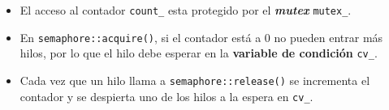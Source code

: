 \begin{Shaded}
\begin{Highlighting}[]
\OperatorTok{\{}
\OperatorTok{:}

\OperatorTok{(}\OperatorTok{=} \OperatorTok{)} \OperatorTok{:} \OperatorTok{(}\OperatorTok{)} \OperatorTok{\{\}}

    \OperatorTok{()} \OperatorTok{\{}
        \OperatorTok{\textless{}}\OperatorTok{\textgreater{}}\OperatorTok{(}\OperatorTok{);} 
        \OperatorTok{++;}
        \OperatorTok{();}                          
    \OperatorTok{\}}

    \OperatorTok{()} \OperatorTok{\{}
        \OperatorTok{\textless{}}\OperatorTok{\textgreater{}}\OperatorTok{(}\OperatorTok{);} 
        \OperatorTok{(} \OperatorTok{==} \OperatorTok{)} \OperatorTok{\{}
            \OperatorTok{(}\OperatorTok{);}                        
        \OperatorTok{\}}
        \OperatorTok{{-}{-};}
    \OperatorTok{\}}

\OperatorTok{:}
    \OperatorTok{;}
    \OperatorTok{;}
     \OperatorTok{;}
\OperatorTok{\};}
\end{Highlighting}
\end{Shaded}

\begin{itemize}
\item
  El acceso al contador \texttt{count\_} esta protegido por el
  \textbf{\emph{mutex}} \texttt{mutex\_}.
\item
  En \texttt{semaphore::acquire()}, si el contador está a 0 no pueden
  entrar más hilos, por lo que el hilo debe esperar en la
  \textbf{variable de condición} \texttt{cv\_}.
\item
  Cada vez que un hilo llama a \texttt{semaphore::release()} se
  incrementa el contador y se despierta uno de los hilos a la espera en
  \texttt{cv\_}.
\end{itemize}

